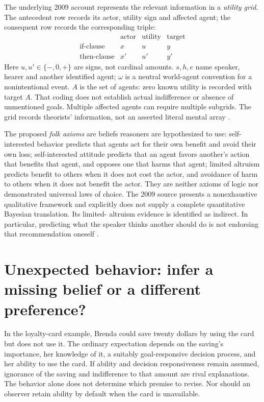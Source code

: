 The underlying 2009 account represents the relevant information in a
\emph{utility grid}. The antecedent row records its actor, utility sign and
affected agent; the consequent row records the corresponding triple:
\[
 \begin{array}{c|ccc}
 &\text{actor}&\text{utility}&\text{target}\\\hline
 \text{if-clause}&x&u&y\\
 \text{then-clause}&x'&u'&y'
 \end{array}
\]
Here \(u,u'\in\{-,0,+\}\) are signs, not cardinal amounts.
\(s,h,e\) name speaker, hearer and another identified agent;
\(\omega\) is a neutral world-agent convention for a nonintentional event.
\(A\) is the set of agents: zero known utility is recorded with target
\(A\). That coding does not establish actual indifference or absence of
unmentioned goals. Multiple affected agents can require multiple subgrids.
The grid records theorists' information, not an asserted literal mental
array \cite[pp.~891--894]{Bonnefon2009UtilityTheory}.

The proposed \emph{folk axioms} are beliefs reasoners are hypothesized to use:
self-interested behavior predicts that agents act for their own benefit and
avoid their own loss; self-interested attitude predicts that an agent favors
another's action that benefits that agent, and opposes one that harms that
agent; limited altruism predicts benefit to others when it does not cost the
actor, and avoidance of harm to others when it does not benefit the actor.
They are neither axioms of logic nor demonstrated universal laws of choice.
The 2009 source presents a nonexhaustive qualitative framework and explicitly
does not supply a complete quantitative Bayesian translation. Its limited-
altruism evidence is identified as indirect. In particular, predicting what
the speaker thinks another should do is not endorsing that recommendation
oneself \cite[pp.~894--898]{Bonnefon2009UtilityTheory}.

\section{Unexpected behavior: infer a missing belief or a different preference?}
\label{sec:p19-r64-revision}

In the loyalty-card example, Brenda could save twenty dollars by using the
card but does not use it. The ordinary expectation depends on the saving's
importance, her knowledge of it, a suitably goal-responsive decision process,
and her ability to use the card. If ability and decision responsiveness remain
assumed, ignorance of the saving and indifference to that amount are rival
explanations. The behavior alone does not determine which premise to revise.
Nor should an observer retain ability by default when the card is unavailable.

